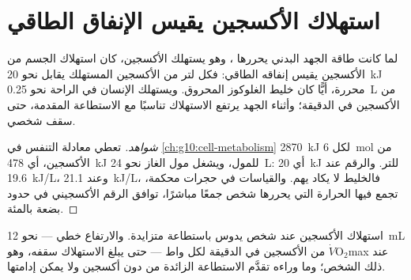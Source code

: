 \section{استهلاك الأكسجين يقيس الإنفاق الطاقي}

\begin{proposition}\label{prop:g10:exercise-and-energy:oxygen}
لما كانت طاقة الجهد البدني يحررها ، وهو يستهلك الأكسجين،
كان استهلاك الجسم من الأكسجين يقيس إنفاقه الطاقي: فكل لتر من الأكسجين
المستهلك يقابل نحو \qty{20}{kJ} محررة، أيًّا كان خليط الغلوكوز
 المحروق. ويستهلك الإنسان في الراحة نحو \qty{0.25}{L} من
الأكسجين في الدقيقة؛ وأثناء الجهد يرتفع الاستهلاك تناسبًا مع
الاستطاعة المقدمة، حتى سقف شخصي.
\end{proposition}
\begin{proof}[شواهد]
تعطي معادلة التنفس في \cref{ch:g10:cell-metabolism} \qty{2870}{kJ}
لكل \qty{6}{mol} من الأكسجين، أي \qty{478}{kJ} للمول، ويشغل مول الغاز
نحو \qty{24}{L}: أي \qty{20}{kJ} للتر. والرقم عند 
\qty{19.6}{kJ/L}، وعند  \qty{21.1}{kJ/L}، فالخليط لا
يكاد يهم. والقياسات في حجرات محكمة، تجمع فيها الحرارة التي يحررها
شخص جمعًا مباشرًا، توافق الرقم الأكسجيني في حدود بضعة بالمئة.
\end{proof}

\begin{omfigure}

{\small استهلاك الأكسجين عند شخص يدوس باستطاعة متزايدة. والارتفاع خطي
--- نحو \qty{12}{mL} من الأكسجين في الدقيقة لكل واط --- حتى يبلغ
الاستهلاك سقفه، وهو $\dot V\!\mathrm{O_2}$max عند ذلك الشخص؛ وما
وراءه تقدَّم الاستطاعة الزائدة من دون أكسجين ولا يمكن إدامتها.}
\end{omfigure}

